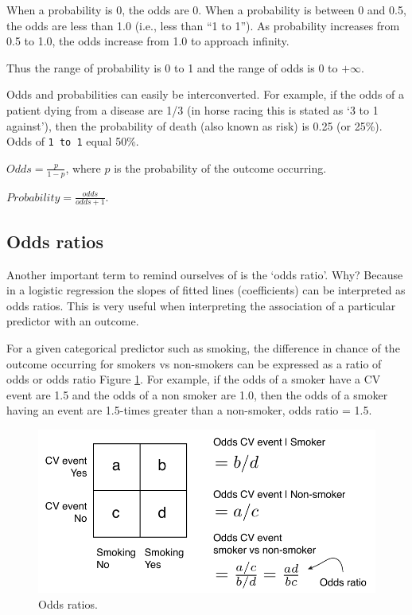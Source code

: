 \documentclass[
  12pt,
  krantz2]{krantz}
\begin{document}
When a probability is 0, the odds are 0.
When a probability is between 0 and 0.5, the odds are less than 1.0 (i.e., less than ``1 to 1'').
As probability increases from 0.5 to 1.0, the odds increase from 1.0 to approach infinity.

Thus the range of probability is 0 to 1 and the range of odds is 0 to \(+\infty\).

Odds and probabilities can easily be interconverted.
For example, if the odds of a patient dying from a disease are 1/3 (in horse racing this is stated as `3 to 1 against'), then the probability of death (also known as risk) is 0.25 (or 25\%).
Odds of \texttt{1\ to\ 1} equal 50\%.

\(Odds = \frac{p}{1-p}\), where \(p\) is the probability of the outcome occurring.

\(Probability = \frac{odds}{odds+1}\).

\hypertarget{odds-ratios}{%
\subsection{Odds ratios}\label{odds-ratios}}


Another important term to remind ourselves of is the `odds ratio'.
Why?
Because in a logistic regression the slopes of fitted lines (coefficients) can be interpreted as odds ratios.
This is very useful when interpreting the association of a particular predictor with an outcome.

For a given categorical predictor such as smoking, the difference in chance of the outcome occurring for smokers vs non-smokers can be expressed as a ratio of odds or odds ratio Figure \ref{fig:chap09-fig-or}.
For example, if the odds of a smoker have a CV event are 1.5 and the odds of a non smoker are 1.0, then the odds of a smoker having an event are 1.5-times greater than a non-smoker, odds ratio = 1.5.

\begin{figure}
\centering
\includegraphics{images/chapter09/1_or.pdf}
\caption{\label{fig:chap09-fig-or}Odds ratios.}
\end{figure}
\end{document}
